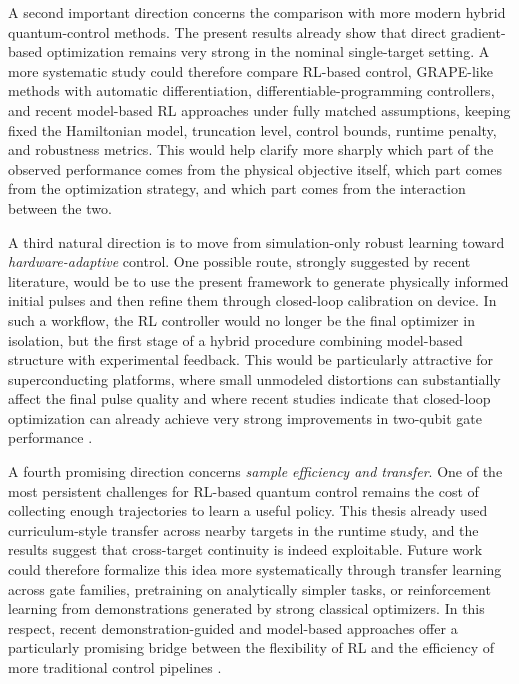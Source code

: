 A second important direction concerns the comparison with more modern hybrid quantum-control methods. The present results already show that direct gradient-based optimization remains very strong in the nominal single-target setting. A more systematic study could therefore compare RL-based control, GRAPE-like methods with automatic differentiation, differentiable-programming controllers, and recent model-based RL approaches under fully matched assumptions, keeping fixed the Hamiltonian model, truncation level, control bounds, runtime penalty, and robustness metrics. This would help clarify more sharply which part of the observed performance comes from the physical objective itself, which part comes from the optimization strategy, and which part comes from the interaction between the two.

A third natural direction is to move from simulation-only robust learning toward \emph{hardware-adaptive} control. One possible route, strongly suggested by recent literature, would be to use the present framework to generate physically informed initial pulses and then refine them through closed-loop calibration on device. In such a workflow, the RL controller would no longer be the final optimizer in isolation, but the first stage of a hybrid procedure combining model-based structure with experimental feedback. This would be particularly attractive for superconducting platforms, where small unmodeled distortions can substantially affect the final pulse quality and where recent studies indicate that closed-loop optimization can already achieve very strong improvements in two-qubit gate performance \cite{Glaser2025}.

A fourth promising direction concerns \emph{sample efficiency and transfer}. One of the most persistent challenges for RL-based quantum control remains the cost of collecting enough trajectories to learn a useful policy. This thesis already used curriculum-style transfer across nearby targets in the runtime study, and the results suggest that cross-target continuity is indeed exploitable. Future work could therefore formalize this idea more systematically through transfer learning across gate families, pretraining on analytically simpler tasks, or reinforcement learning from demonstrations generated by strong classical optimizers. In this respect, recent demonstration-guided and model-based approaches offer a particularly promising bridge between the flexibility of RL and the efficiency of more traditional control pipelines \cite{Khalid2023}.


